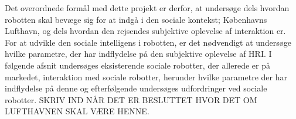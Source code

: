 Det overordnede formål med dette projekt er derfor, at undersøge dels hvordan robotten skal bevæge sig for at indgå i den sociale kontekst; Københavns Lufthavn, og dels hvordan den rejsendes subjektive oplevelse af interaktion er.\blankline
%  
For at udvikle den sociale intelligens i robotten, er det nødvendigt at undersøge hvilke parametre, der har indflydelse på den subjektive oplevelse af HRI. I følgende afsnit undersøges eksisterende sociale robotter, der allerede er på markedet, interaktion med sociale robotter, herunder hvilke parametre der har indflydelse på denne og efterfølgende undersøges udfordringer ved sociale robotter. SKRIV IND NÅR DET ER BESLUTTET HVOR DET OM LUFTHAVNEN SKAL VÆRE HENNE.   

